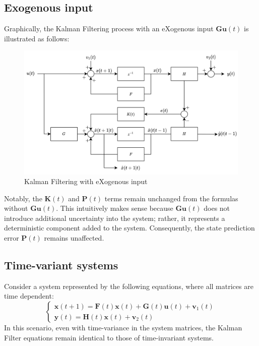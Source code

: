 \subsection{Exogenous input}
Graphically, the Kalman Filtering process with an eXogenous input $\mathbf{Gu}(t)$ is illustrated as follows:
\begin{figure}[H]
    \centering
    \includegraphics[width=0.75\linewidth]{images/ke.png}
    \caption{Kalman Filtering with eXogenous input}
\end{figure}
Notably, the $\mathbf{K}(t)$ and $\mathbf{P}(t)$ terms remain unchanged from the formulas without $\mathbf{Gu}(t)$. 
This intuitively makes sense because $\mathbf{Gu}(t)$ does not introduce additional uncertainty into the system; rather, it represents a deterministic component added to the system. 
Consequently, the state prediction error $\mathbf{P}(t)$ remains unaffected.

\subsection{Time-variant systems}
Consider a system represented by the following equations, where all matrices are time dependent:
\[\begin{cases}
    \mathbf{x}(t+1)=\mathbf{F}(t)\mathbf{x}(t)+\mathbf{G}(t)\mathbf{u}(t)+\mathbf{v}_1(t) \\
    \mathbf{y}(t)=\mathbf{H}(t)\mathbf{x}(t)+\mathbf{v}_2(t)
\end{cases}\]
In this scenario, even with time-variance in the system matrices, the Kalman Filter equations remain identical to those of time-invariant systems.